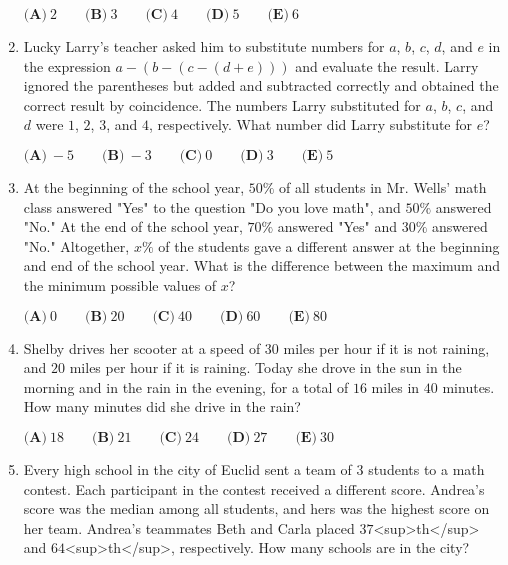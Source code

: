 \documentclass{article}
\begin{document}
\begin{enumerate}[label=\arabic*., itemsep=0.5em]
\(\textbf{(A)}\ 2 \qquad \textbf{(B)}\ 3 \qquad \textbf{(C)}\ 4 \qquad \textbf{(D)}\ 5 \qquad \textbf{(E)}\ 6\)\par \vspace{0.5em}\item Lucky Larry's teacher asked him to substitute numbers for \(a\), \(b\), \(c\), \(d\), and \(e\) in the expression \(a-(b-(c-(d+e)))\) and evaluate the result. Larry ignored the parentheses but added and subtracted correctly and obtained the correct result by coincidence. The numbers Larry substituted for \(a\), \(b\), \(c\), and \(d\) were \(1\), \(2\), \(3\), and \(4\), respectively. What number did Larry substitute for \(e\)?

\(\textbf{(A)}\ -5 \qquad \textbf{(B)}\ -3 \qquad \textbf{(C)}\ 0 \qquad \textbf{(D)}\ 3 \qquad \textbf{(E)}\ 5\)\par \vspace{0.5em}\item At the beginning of the school year, \(50\%\) of all students in Mr. Wells' math class answered "Yes" to the question "Do you love math", and \(50\%\) answered "No." At the end of the school year, \(70\%\) answered "Yes" and \(30\%\) answered "No." Altogether, \(x\%\) of the students gave a different answer at the beginning and end of the school year. What is the difference between the maximum and the minimum possible values of \(x\)?

\(\textbf{(A)}\ 0 \qquad \textbf{(B)}\ 20 \qquad \textbf{(C)}\ 40 \qquad \textbf{(D)}\ 60 \qquad \textbf{(E)}\ 80\)\par \vspace{0.5em}\item Shelby drives her scooter at a speed of \(30\) miles per hour if it is not raining, and \(20\) miles per hour if it is raining. Today she drove in the sun in the morning and in the rain in the evening, for a total of \(16\) miles in \(40\) minutes. How many minutes did she drive in the rain?

\(\textbf{(A)}\ 18 \qquad \textbf{(B)}\ 21 \qquad \textbf{(C)}\ 24 \qquad \textbf{(D)}\ 27 \qquad \textbf{(E)}\ 30\)\par \vspace{0.5em}\item Every high school in the city of Euclid sent a team of \(3\) students to a math contest. Each participant in the contest received a different score. Andrea's score was the median among all students, and hers was the highest score on her team. Andrea's teammates Beth and Carla placed \(37\)<sup>th</sup> and \(64\)<sup>th</sup>, respectively. How many schools are in the city?


\end{enumerate}
\end{document}
